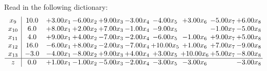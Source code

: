 \documentclass[9pt]{article}
\begin{document}
Read in the following dictionary:
\[\begin{array}{c| c c@{\hskip 2pt} c@{\hskip 2pt} c@{\hskip 2pt} c@{\hskip 2pt} c@{\hskip 2pt} c@{\hskip 2pt} c@{\hskip 2pt} c@{\hskip 2pt} }
 x_{9}   &  10.0 & +  3.00 x_{1} & -6.00 x_{2} & +  9.00 x_{3} & -3.00 x_{4} & -4.00 x_{5} & +  3.00 x_{6} & -5.00 x_{7} & +  6.00 x_{8}\\
 x_{10}   &  6.0 & +  8.00 x_{1} & +  2.00 x_{2} & +  7.00 x_{3} & -1.00 x_{4} & -9.00 x_{5} &   & -1.00 x_{7} & -5.00 x_{8}\\
 x_{11}   &  4.0 & +  9.00 x_{1} & +  4.00 x_{2} & -7.00 x_{3} & -2.00 x_{4} & -6.00 x_{5} & -1.00 x_{6} & +  9.00 x_{7} & +  5.00 x_{8}\\
 x_{12}   &  16.0 & -6.00 x_{1} & +  8.00 x_{2} & -2.00 x_{3} & -7.00 x_{4} & + 10.00 x_{5} & +  1.00 x_{6} & +  7.00 x_{7} & -9.00 x_{8}\\
 x_{13}   &  -3.0 & -4.00 x_{1} & -8.00 x_{2} & +  9.00 x_{3} & +  4.00 x_{4} & +  3.00 x_{5} & + 10.00 x_{6} & +  5.00 x_{7} & -8.00 x_{8}\\
\hline
z    &  0.0 & +  1.00 x_{1} & -1.00 x_{2} & -5.00 x_{3} & -2.00 x_{4} & -3.00 x_{5} & -3.00 x_{6} &   & -3.00 x_{8}\\
\end{array}\]
\end{document}
